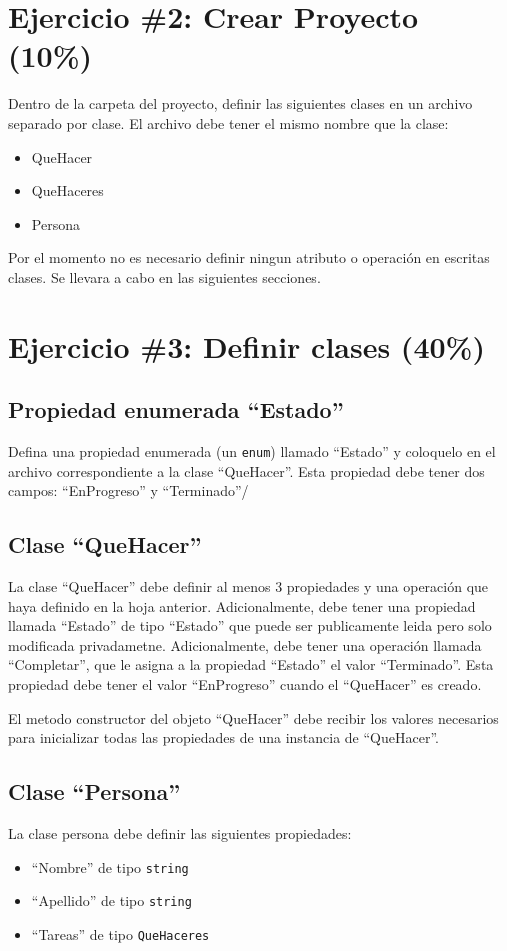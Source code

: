 \documentclass{article}
\begin{document}
\section*{Ejercicio \#2: Crear Proyecto (10\%)}

Dentro de la carpeta del proyecto, definir las siguientes clases en un archivo
separado por clase. El archivo debe tener el mismo nombre que la clase:
\begin{itemize}
        \item{QueHacer}
        \item{QueHaceres}
        \item{Persona}
\end{itemize}
Por el momento no es necesario definir ningun atributo o operaci\'on en escritas
clases. Se llevara a cabo en las siguientes secciones.

\section*{Ejercicio \#3: Definir clases (40\%)}

\subsection*{Propiedad enumerada ``Estado''}

Defina una propiedad enumerada (un \texttt{enum}) llamado ``Estado'' y coloquelo
en el archivo correspondiente a la clase ``QueHacer''. Esta propiedad debe tener
dos campos: ``EnProgreso'' y ``Terminado''/

\subsection*{Clase ``QueHacer''}
La clase ``QueHacer'' debe definir al menos 3 propiedades y una operaci\'on que
haya definido en la hoja anterior. Adicionalmente, debe tener una propiedad llamada
``Estado'' de tipo ``Estado'' que puede ser publicamente leida pero solo modificada
privadametne. Adicionalmente, debe tener una operaci\'on llamada ``Completar'', que
le asigna a la propiedad ``Estado'' el valor ``Terminado''. Esta propiedad debe
tener el valor ``EnProgreso'' cuando el ``QueHacer'' es creado.

El metodo constructor del objeto ``QueHacer'' debe recibir los valores necesarios
para inicializar todas las propiedades de una instancia de ``QueHacer''.

\subsection*{Clase ``Persona''}
La clase persona debe definir las siguientes propiedades:
\begin{itemize}
        \item{``Nombre'' de tipo \texttt{string}}
        \item{``Apellido'' de tipo \texttt{string}}
        \item{``Tareas'' de tipo \texttt{QueHaceres}}
\end{itemize}
\end{document}
